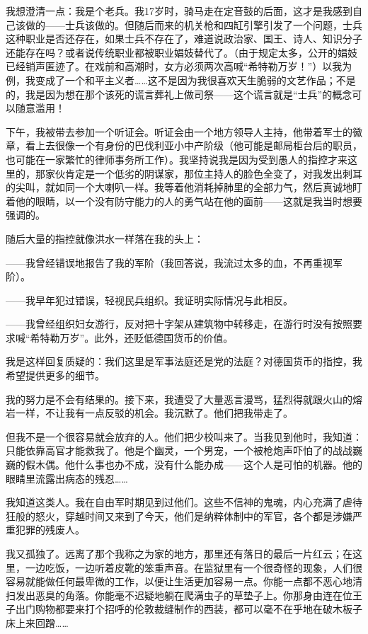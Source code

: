 \documentclass[UTF8]{ctexart}
\begin{document}
我想澄清一点：我是个老兵。我17岁时，骑马走在定音鼓的后面，这才是我感到自己该做的——士兵该做的。但随后而来的机关枪和四缸引擎引发了一个问题，士兵这种职业是否还存在，如果士兵不存在了，难道说政治家、国王、诗人、知识分子还能存在吗？或者说传统职业都被职业娼妓替代了。（由于规定太多，公开的娼妓已经销声匿迹了。在戏前和高潮时，女方必须两次高喊“希特勒万岁！”）以我为例，我变成了一个和平主义者……这不是因为我很喜欢天生脆弱的文艺作品；不是的，我是因为想在那个该死的谎言葬礼上做司祭——这个谎言就是“士兵”的概念可以随意滥用！

下午，我被带去参加一个听证会。听证会由一个地方领导人主持，他带着军士的徽章，看上去很像一个有身份的巴伐利亚小中产阶级（他可能是邮局柜台后的职员，也可能在一家繁忙的律师事务所工作）。我坚持说我是因为受到愚人的指控才来这里的，那家伙肯定是一个低劣的阴谋家，那位主持人的脸色全变了，对我发出刺耳的尖叫，就如同一个大喇叭一样。我等着他消耗掉肺里的全部力气，然后真诚地盯着他的眼睛，以一个没有防守能力的人的勇气站在他的面前——这就是我当时想要强调的。

随后大量的指控就像洪水一样落在我的头上：

——我曾经错误地报告了我的军阶（我回答说，我流过太多的血，不再重视军阶）。

——我早年犯过错误，轻视民兵组织。我证明实际情况与此相反。

——我曾经组织妇女游行，反对把十字架从建筑物中转移走，在游行时没有按照要求喊“希特勒万岁”。此外，还贬低德国货币的价值。

我是这样回复质疑的：我们这里是军事法庭还是党的法庭？对德国货币的指控，我希望提供更多的细节。

我的努力是不会有结果的。接下来，我遭受了大量恶言漫骂，猛烈得就跟火山的熔岩一样，不让我有一点反驳的机会。我沉默了。他们把我带走了。

但我不是一个很容易就会放弃的人。他们把少校叫来了。当我见到他时，我知道：只能依靠高官才能救我了。他是个幽灵，一个男宠，一个被枪炮声吓怕了的战战巍巍的假木偶。他什么事也办不成，没有什么能办成——这个人是可怕的机器。他的眼睛里流露出病态的残忍……

我知道这类人。我在自由军时期见到过他们。这些不信神的鬼魂，内心充满了虐待狂般的怒火，穿越时间又来到了今天，他们是纳粹体制中的军官，各个都是涉嫌严重犯罪的残废人。

我又孤独了。远离了那个我称之为家的地方，那里还有落日的最后一片红云；在这里，一边吃饭，一边听着皮靴的笨重声音。在监狱里有一个很奇怪的现象，人们很容易就能做任何最卑微的工作，以便让生活更加容易一点。你能一点都不恶心地清扫发出恶臭的角落。你能毫不迟疑地躺在爬满虫子的草垫子上。你那身由连在位王子出门购物都要来打个招呼的伦敦裁缝制作的西装，都可以毫不在乎地在破木板子床上来回蹭……
\end{document}

